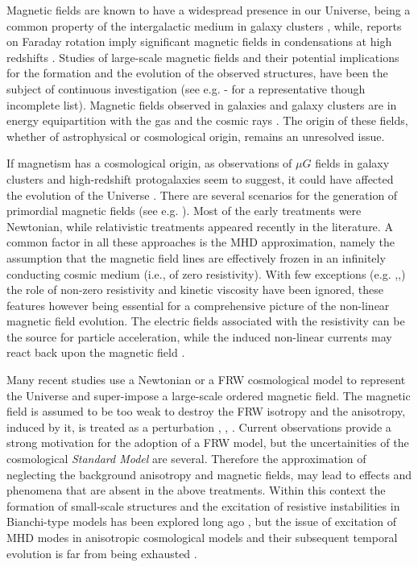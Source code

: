 \documentclass[prd,twocolumn,showpacs,preprintnumbers,amsmath,amssy mb]{revtex4}
\begin{document}
Magnetic fields are known to have a widespread presence in 
our Universe, being a common property of the intergalactic 
medium in galaxy clusters \cite{kron1}, while, reports on 
Faraday rotation imply significant magnetic fields in 
condensations at high redshifts \cite{kron2}. Studies of 
large-scale magnetic fields and their potential implications 
for the formation and the evolution of the observed structures, 
have been the subject of continuous investigation (see e.g. 
\cite{thorn}-\cite{jedam} for a representative though incomplete 
list). Magnetic fields observed in galaxies and galaxy clusters 
are in energy equipartition with the gas and the cosmic rays 
\cite{wolf}. The origin of these fields, whether of astrophysical 
or cosmological origin, remains an unresolved issue. 

If magnetism has a cosmological origin, as observations of $\mu G$ 
fields in galaxy clusters and high-redshift protogalaxies seem to 
suggest, it could have affected the evolution of the Universe 
\cite{giov}. There are several scenarios for the generation 
of primordial magnetic fields (see e.g. \cite{gras}). Most 
of the early treatments were Newtonian, while relativistic 
treatments appeared recently in the literature. A common factor in 
all these approaches is the MHD approximation, namely the 
assumption that the magnetic field lines are effectively frozen 
in an infinitely conducting cosmic medium 
(i.e., of zero resistivity). With few exceptions 
(e.g. \cite{fenn},\cite{jedam1},\cite{vlah}) the role of 
non-zero resistivity and kinetic viscosity have been 
ignored, these features however being essential for 
a comprehensive picture of the non-linear magnetic field 
evolution. The electric fields associated with the resistivity 
can be the source for particle acceleration, while the induced 
non-linear currents may react back upon the magnetic 
field \cite{vlah}. 

Many recent studies use a Newtonian or a FRW cosmological 
model to represent the Universe and super-impose a large-scale 
ordered magnetic field. The magnetic field is assumed to be 
too weak to destroy the FRW isotropy and the anisotropy, induced 
by it, is treated as a perturbation \cite{ruzm}, \cite{tsag}, 
\cite{durr}. Current 
observations provide a strong motivation for the adoption 
of a FRW model, but the uncertainities of the cosmological 
{\it Standard Model} are several. Therefore the approximation 
of neglecting the background anisotropy and magnetic fields, 
may lead to effects and phenomena that are absent in the 
above treatments. 
Within this context the formation of small-scale structures 
and the excitation of resistive instabilities in Bianchi-type 
models has been explored long ago \cite{fenn}, but the 
issue of excitation of MHD modes in anisotropic cosmological 
models and their subsequent temporal evolution is far from being 
exhausted \cite{pap2}.
\end{document}
